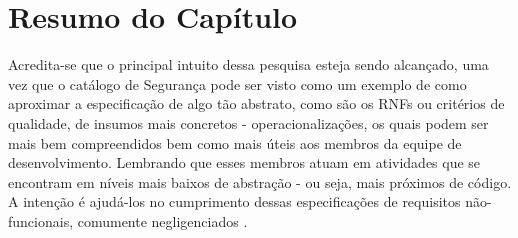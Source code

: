 \section{Resumo do Capítulo}

Acredita-se que o principal intuito dessa pesquisa esteja sendo alcançado, uma vez que o catálogo de Segurança pode ser visto como um exemplo de como aproximar a especificação de algo tão abstrato, como são os RNFs ou critérios de qualidade, de insumos mais concretos - operacionalizações, os quais podem ser mais bem compreendidos bem como mais úteis aos membros da equipe de desenvolvimento. Lembrando que esses membros atuam em atividades que se encontram em níveis mais baixos de abstração - ou seja, mais próximos de código. A intenção é ajudá-los no cumprimento dessas especificações de requisitos não-funcionais, comumente negligenciados \cite{eckhardt2016non}.
